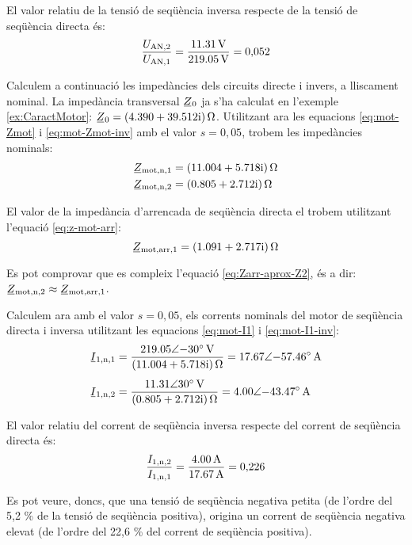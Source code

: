 \begin{exemple}
	El valor relatiu de la tensió de seqüència inversa respecte de la tensió de seqüència directa és:
	\[
		\frac{U_\mathrm{AN,2}}{U_\mathrm{AN,1}} = \frac{\qty{11,31}{V}}{\qty{219,05}{V}} = 0{,}052
	\]
	
	Calculem a continuació les impedàncies dels circuits directe i invers, a lliscament nominal. La impedància transversal $\cmplx{Z}_0$ ja s'ha calculat en l'exemple \ref{ex:CaractMotor}: $ \cmplx{Z}_0 =  \complexqty{4,390+j39,512}{\ohm} $. Utilitzant ara les equacions \eqref{eq:mot-Zmot} i \eqref{eq:mot-Zmot-inv} amb el valor $s=0{,}05$, trobem les impedàncies nominals:
	\begin{align*}
		\cmplx{Z}\ped{mot,n,1} &= \complexqty{11,004+j5,718}{\ohm} \\
		\cmplx{Z}\ped{mot,n,2} &= \complexqty{0,805+j2,712}{\ohm}
	\end{align*}
	
	El valor de la impedància d'arrencada de seqüència directa el trobem utilitzant l'equació \eqref{eq:z-mot-arr}:
	\[
		\cmplx{Z}\ped{mot,arr,1} = \complexqty{1,091+j2,717}{\ohm}
	\]
	
	Es pot comprovar que es compleix l'equació \eqref{eq:Zarr-aprox-Z2}, és a dir: $\cmplx{Z}\ped{mot,n,2} \approx \cmplx{Z}\ped{mot,arr,1}$.
	
	Calculem ara amb el valor $s=0{,}05$, els corrents nominals del motor de seqüència directa i inversa utilitzant les equacions \eqref{eq:mot-I1} i \eqref{eq:mot-I1-inv}:
	\begin{align*}
		\cmplx{I}\ped{1,n,1} &=  \frac{\complexqty{219,05:-30}{V}}{\complexqty{11,004+j5,718}{\ohm}} = \complexqty{17,67:-57,46}{A} \\[1ex] 
		\cmplx{I}\ped{1,n,2} &= \frac{\complexqty{11,31:30}{V}}{\complexqty{0,805+j2,712}{\ohm}} = \complexqty{4,00:-43,47}{A}
	\end{align*}
	
	El valor relatiu del corrent de seqüència inversa respecte del corrent de seqüència directa és:
	\[
		\frac{I_\mathrm{1,n,2}}{I_\mathrm{1,n,1}} = \frac{\qty{4,00}{A}}{\qty{17,67}{A}} = 0{,}226
	\]	
	
	Es pot veure, doncs, que una tensió de seqüència negativa petita (de l'ordre del 5,2 \% de la tensió de seqüència positiva), origina un corrent de seqüència negativa elevat (de l'ordre del 22,6 \% del corrent de seqüència positiva). 
	

\end{exemple}
